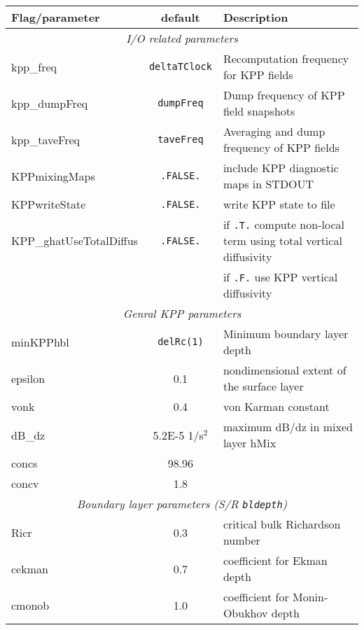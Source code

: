 \begin{table}[!ht]
\centering
  \label{tab:pkg:kpp:runtime_flags}
  {\footnotesize
    \begin{tabular}{|l|c|l|}
      \hline 
      \textbf{Flag/parameter} & \textbf{default} &  \textbf{Description}  \\
      \hline \hline
         \multicolumn{3}{|c|}{\textit{I/O related parameters} } \\
         \hline
        kpp\_freq & \texttt{deltaTClock} & 
           Recomputation frequency for KPP fields \\
        kpp\_dumpFreq & \texttt{dumpFreq} & 
           Dump frequency of KPP field snapshots \\
        kpp\_taveFreq & \texttt{taveFreq} & 
           Averaging and dump frequency of KPP fields \\
        KPPmixingMaps & \texttt{.FALSE.} & 
           include KPP diagnostic maps in STDOUT \\
        KPPwriteState & \texttt{.FALSE.} & 
           write KPP state to file \\
        KPP\_ghatUseTotalDiffus & \texttt{.FALSE.} & 
           if \texttt{.T.} compute non-local term using total vertical diffusivity \\
        ~ & ~ &
           if \texttt{.F.} use KPP vertical diffusivity \\
      \hline
      \multicolumn{3}{|c|}{\textit{Genral KPP parameters} } \\
      \hline
        minKPPhbl & \texttt{delRc(1)} & 
           Minimum boundary layer depth \\
        epsilon & 0.1 & 
           nondimensional extent of the surface layer \\
        vonk & 0.4 & 
           von Karman constant \\
        dB\_dz & 5.2E-5 1/s$^2$ & 
           maximum dB/dz in mixed layer hMix \\
        concs & 98.96 &
           ~ \\
        concv & 1.8 &
           ~ \\
      \hline
      \multicolumn{3}{|c|}{\textit{Boundary layer parameters (S/R \texttt{bldepth})} } \\
      \hline
        Ricr & 0.3 & 
           critical bulk Richardson number \\
        cekman & 0.7 & 
           coefficient for Ekman depth \\
        cmonob & 1.0 & 
           coefficient for Monin-Obukhov depth \\

\end{tabular}}
\end{table}
